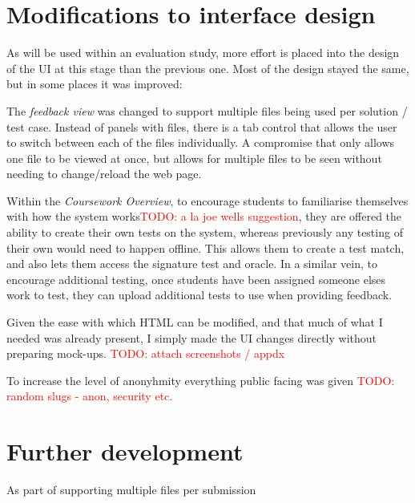 \documentclass[a4paper,11pt]{report}
\newcommand{\todo}[1]{\textcolor{red}{TODO: #1}}
\begin{document}
\section{Modifications to interface design}
As will be used within an evaluation study, more effort is placed into the design of the UI at this stage than the previous one. Most of the design stayed the same, but in some places it was improved:\par
The \textit{feedback view} was changed to support multiple files being used per solution / test case. Instead of panels with files, there is a tab control that allows the user to switch between each of the files individually. A compromise that only allows one file to be viewed at once, but allows for multiple files to be seen without needing to change/reload the web page.\par
Within the \textit{Coursework Overview}, to encourage students to familiarise themselves with how the system works\todo{a la joe wells suggestion}, they are offered the ability to create their own tests on the system, whereas previously any testing of their own would need to happen offline. This allows them to create a test match, and also lets them access the signature test and oracle. In a similar vein, to encourage additional testing, once students have been assigned someone elses work to test, they can upload additional tests to use when providing feedback.\par
Given the ease with which HTML can be modified, and that much of what I needed was already present, I simply made the UI changes directly without preparing mock-ups. \todo{attach screenshots / appdx}\par
To increase the level of anonyhmity everything public facing was given \todo{random slugs - anon, security etc.}
\section{Further development}
As part of supporting multiple files per submission
\end{document}
